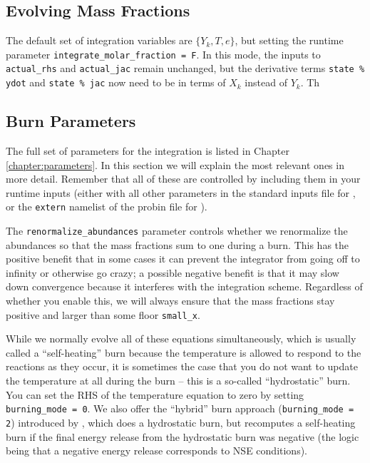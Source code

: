 

\subsection{Evolving Mass Fractions}

The default set of integration variables are $\{Y_k, T, e\}$, but 
setting the runtime parameter {\tt integrate\_molar\_fraction = F}.
In this mode, the inputs to {\tt actual\_rhs} and {\tt actual\_jac}
remain unchanged, but the derivative terms {\tt state \% ydot} and
{\tt state \% jac} now need to be in terms of $X_k$ instead of $Y_k$.
Th

\subsection{Burn Parameters}

The full set of parameters for the integration is listed in Chapter \ref{chapter:parameters}.
In this section we will explain the most relevant ones in more detail.
Remember that all of these are controlled by including them in your runtime
inputs (either with all other parameters in the standard inputs file for
\maestro, or the \texttt{extern} namelist of the probin file for \castro).


The \texttt{renormalize\_abundances} parameter controls whether we renormalize
the abundances so that the mass fractions sum to one during a burn. This
has the positive benefit that in some cases it can prevent the integrator
from going off to infinity or otherwise go crazy; a possible negative benefit
is that it may slow down convergence because it interferes with the integration
scheme. Regardless of whether you enable this, we will always ensure that the
mass fractions stay positive and larger than some floor \texttt{small\_x}.

While we normally evolve all of these equations simultaneously, which is
usually called a ``self-heating'' burn because the temperature is allowed
to respond to the reactions as they occur, it is
sometimes the case that you do not want to update the temperature at all
during the burn -- this is a so-called ``hydrostatic'' burn. You can
set the RHS of the temperature equation to zero by setting
\texttt{burning\_mode = 0}. We also offer the ``hybrid'' burn approach
(\texttt{burning\_mode = 2}) introduced by \cite{raskin:2010}, which
does a hydrostatic burn, but recomputes a self-heating burn if the
final energy release from the hydrostatic burn was negative (the
logic being that a negative energy release corresponds to NSE conditions).


